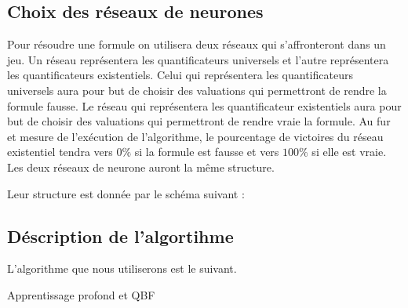 \documentclass{article}
\begin{document}
\subsection{Choix des réseaux de neurones}
Pour résoudre une formule on utilisera deux réseaux qui s'affronteront dans un jeu. Un réseau représentera les quantificateurs universels et l'autre représentera les quantificateurs existentiels. Celui qui représentera les quantificateurs universels aura pour but de choisir des valuations qui permettront de rendre la formule fausse. Le réseau qui représentera les quantificateur existentiels aura pour but de choisir des valuations qui permettront de rendre vraie la formule. Au fur et mesure de l'exécution de l'algorithme, le pourcentage de victoires du réseau existentiel tendra vers $0\%$ si la formule est fausse et vers $100\%$ si elle est vraie. Les deux réseaux de neurone auront la même structure.\newpage

Leur structure est donnée par le schéma suivant :

\begin{center}
\end{center}

\subsection{Déscription de l'algortihme}
L'algorithme que nous utiliserons est le suivant.
	\begin{algorithm}
	\caption{Apprentissage profond et QBF}
	\begin{algorithmic}
	\REQUIRE  
	\STATE   
	\STATE  
	\end{algorithmic}
	\end{algorithm} 
\end{document}
